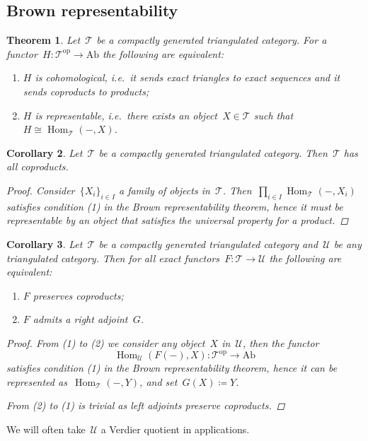 \documentclass[10pt,a4paper]{article}
\theoremstyle{lecture}
\newtheorem{theorem}{Theorem}
\newtheorem{corollary}[theorem]{Corollary}
\newcommand\Ab{\ensuremath{\mathrm{Ab}}}
\newcommand\opp{\ensuremath{\mathrm{op}}}
\DeclareMathOperator\Hom{Hom}
\begin{document}
\subsection{Brown representability}
\begin{theorem}
  Let~$\mathcal{T}$ be a compactly generated triangulated category. For a functor~$H\colon\mathcal{T}^\opp\to\Ab$ the following are equivalent:
  \begin{enumerate}
    \item $H$ is cohomological, i.e.\ it sends exact triangles to exact sequences and it sends coproducts to products;
    \item $H$ is representable, i.e.\ there exists an object~$X\in\mathcal{T}$ such that~$H\cong\Hom_{\mathcal{T}}(-,X)$.
  \end{enumerate}
\end{theorem}
\begin{corollary}
  Let~$\mathcal{T}$ be a compactly generated triangulated category. Then~$\mathcal{T}$ has all coproducts.
  \begin{proof}
    Consider~$\{X_i\}_{i\in I}$ a family of objects in~$\mathcal{T}$. Then~$\prod_{i\in I}\Hom_{\mathcal{T}}(-,X_i)$ satisfies condition (1) in the Brown representability theorem, hence it must be representable by an object that satisfies the universal property for a product.
  \end{proof}
\end{corollary}
\begin{corollary}
  Let~$\mathcal{T}$ be a compactly generated triangulated category and~$\mathcal{U}$ be any triangulated category. Then for all exact functors~$F\colon\mathcal{T}\to\mathcal{U}$ the following are equivalent:
  \begin{enumerate}
    \item $F$ preserves coproducts;
    \item $F$ admits a right adjoint~$G$.
  \end{enumerate}
  \begin{proof}
    From (1) to (2) we consider any object~$X$ in~$\mathcal{U}$, then the functor
    \begin{equation}
      \Hom_{\mathcal{U}}(F(-),X)\colon\mathcal{T}^\opp\to\Ab 
    \end{equation}
    satisfies condition (1) in the Brown representability theorem, hence it can be represented as~$\Hom_{\mathcal{T}}(-,Y)$, and set~$G(X)\coloneqq Y$.

    From (2) to (1) is trivial as left adjoints preserve coproducts.
  \end{proof}
\end{corollary}
We will often take~$\mathcal{U}$ a Verdier quotient in applications.
\end{document}
